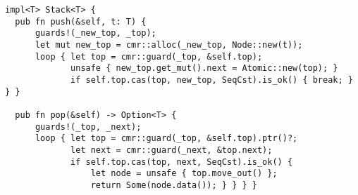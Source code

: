 \begin{lstlisting}[caption=\code{Stack::push} and \code{Stack::pop},label=lst:stack-ops]
impl<T> Stack<T> {
  pub fn push(&self, t: T) {
      guards!(_new_top, _top);
      let mut new_top = cmr::alloc(_new_top, Node::new(t));
      loop { let top = cmr::guard(_top, &self.top);
             unsafe { new_top.get_mut().next = Atomic::new(top); }
             if self.top.cas(top, new_top, SeqCst).is_ok() { break; } } }

  pub fn pop(&self) -> Option<T> {
      guards!(_top, _next);
      loop { let top = cmr::guard(_top, &self.top).ptr()?;
             let next = cmr::guard(_next, &top.next);
             if self.top.cas(top, next, SeqCst).is_ok() {
                 let node = unsafe { top.move_out() };
                 return Some(node.data()); } } } }
\end{lstlisting}

